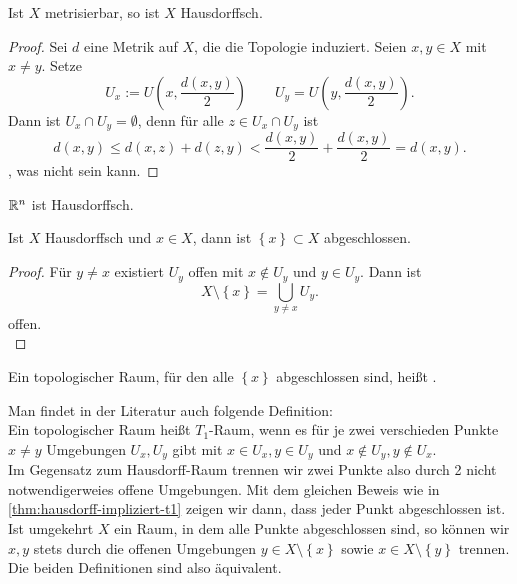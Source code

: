 \begin{theorem}\label{thm:metrisierbarer-raum-ist-hausdorff}
    Ist $X$ metrisierbar, so ist  $X$ Hausdorffsch.
\end{theorem}
\begin{proof}
    Sei $d$ eine Metrik auf  $X$, die die Topologie induziert. Seien  $x,y\in X$ mit $x\neq y$. Setze
    \[
        U_x := U\left( x, \frac{d(x,y)}{2} \right) \qquad U_y = U\left( y, \frac{d(x,y)}{2} \right) 
    .\] 
    Dann ist $U_x \cap U_y = \emptyset$, denn für alle $z\in U_x \cap U_y$ ist
    \[
        d(x,y) \leq  d(x,z) + d(z,y) < \frac{d(x,y)}{2} + \frac{d(x,y)}{2} = d(x,y)
    .\] 
    , was nicht sein kann.
\end{proof}
\begin{example}
    $\mathbb{R}^n$ ist Hausdorffsch.
\end{example}
\begin{theorem}\label{thm:hausdorff-impliziert-t1}
    Ist $X$ Hausdorffsch und  $x\in X$, dann ist $\left \{x\right\} \subset X$ abgeschlossen.
\end{theorem}
\begin{proof}
    Für $y\neq x$ existiert $U_y$ offen mit  $x\not\in U_y$ und $y\in U_y$. Dann ist
    \[
    X \setminus \left \{x\right\}  = \bigcup_{y\neq x} U_y 
    .\] 
    offen. \\
\end{proof}
    \begin{minipage}{\textwidth}
        \centering
    \end{minipage}
\begin{remark}
    Ein topologischer Raum, für den alle $\left \{x\right\} $ abgeschlossen sind, heißt .
\end{remark}
\begin{remark*}
    Man findet in der Literatur auch folgende Definition: \\
    Ein topologischer Raum heißt $T_1$-Raum, wenn es für je zwei verschieden Punkte $x\neq y$ Umgebungen $U_x,U_y$ gibt mit  $x\in U_x, y\in U_y$ und $x\not\in U_y, y\not\in U_x$. \\
    Im Gegensatz zum Hausdorff-Raum trennen wir zwei Punkte also durch 2 nicht notwendigerweies offene Umgebungen. Mit dem gleichen Beweis wie in \autoref{thm:hausdorff-impliziert-t1} zeigen wir dann, dass jeder Punkt abgeschlossen ist. Ist umgekehrt $X$ ein Raum, in dem alle Punkte abgeschlossen sind, so können wir  $x,y$ stets durch die offenen Umgebungen  $y\in X \setminus \left \{x\right\} $ sowie $x\in X \setminus \left \{y\right\} $ trennen. Die beiden Definitionen sind also äquivalent.
    \begin{minipage}{\textwidth}
    \end{minipage}
\end{remark*}




